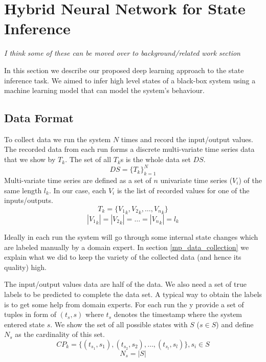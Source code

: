\section{Hybrid Neural Network for State Inference}
\textit{I think some of these can be moved over to background/related work section}

In this section we describe our proposed deep learning approach to the state inference task. 
We aimed to infer high level states of a black-box system using a machine learning model that can model the system's behaviour. 

\subsection{Data Format} \label{data_collection}

To collect data we run the system $N$ times and record the input/output values. The recorded data from each run forms a discrete multi-variate time series data that we show by $T_k$. The set of all $T_k$s is the whole data set $DS$.
\begin{equation}
    DS = \{T_k\}_{k=1}^N
\end{equation}
Multi-variate time series are defined as a set of $n$ univariate time series ($V_i$) of the same length $l_k$. In our case, each $V_i$ is the list of recorded values for one of the inputs/outputs.
\begin{equation}
    T_k = \{{V_1}_k, {V_2}_k, \ldots, {V_n}_k\}
\end{equation}
\begin{equation}
    |{V_1}_k|=|{V_2}_k|=\ldots=|{V_n}_k|=l_k 
\end{equation}


Ideally in each run the system will go through some internal state changes which are labeled manually by a domain expert. In section \ref{mp_data_collection} we explain what we did to keep the variety of the collected data (and hence its quality) high.

The input/output values data are half of the data. We also need a set of true labels to be predicted to complete the data set.
A typical way to obtain the labels is to get some help from domain experts. For each run the y provide a set of tuples in form of $(t_s, s)$ where $t_s$ denotes the timestamp where the system entered state $s$. We show the set of all possible states with $S$ ($s \in S$) and define $N_s$ as the cardinality of this set. 
\begin{equation}\label{eq:change_point}
    CP_k = \big\{ (t_{s_1}, s_1), (t_{s_2}, s_2), \ldots, (t_{s_l}, s_l) \big\} , s_i \in S
\end{equation}
$$N_s = |S|$$


